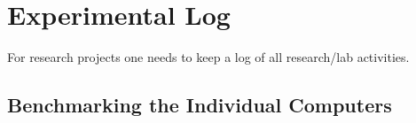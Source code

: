 

\chapter{Experimental Log}

For research projects one needs to keep a log of all research/lab activities.   



\section{Benchmarking the Individual Computers}

